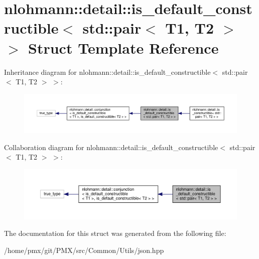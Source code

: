 \hypertarget{structnlohmann_1_1detail_1_1is__default__constructible_3_01std_1_1pair_3_01T1_00_01T2_01_4_01_4}{}\section{nlohmann\+:\+:detail\+:\+:is\+\_\+default\+\_\+constructible$<$ std\+:\+:pair$<$ T1, T2 $>$ $>$ Struct Template Reference}
\label{structnlohmann_1_1detail_1_1is__default__constructible_3_01std_1_1pair_3_01T1_00_01T2_01_4_01_4}


Inheritance diagram for nlohmann\+:\+:detail\+:\+:is\+\_\+default\+\_\+constructible$<$ std\+:\+:pair$<$ T1, T2 $>$ $>$\+:
\nopagebreak
\begin{figure}[H]
\begin{center}
\leavevmode
\includegraphics[width=350pt]{structnlohmann_1_1detail_1_1is__default__constructible_3_01std_1_1pair_3_01T1_00_01T2_01_4_01_4__inherit__graph}
\end{center}
\end{figure}


Collaboration diagram for nlohmann\+:\+:detail\+:\+:is\+\_\+default\+\_\+constructible$<$ std\+:\+:pair$<$ T1, T2 $>$ $>$\+:
\nopagebreak
\begin{figure}[H]
\begin{center}
\leavevmode
\includegraphics[width=350pt]{structnlohmann_1_1detail_1_1is__default__constructible_3_01std_1_1pair_3_01T1_00_01T2_01_4_01_4__coll__graph}
\end{center}
\end{figure}


The documentation for this struct was generated from the following file\+:\begin{DoxyCompactItemize}
\item 
/home/pmx/git/\+P\+M\+X/src/\+Common/\+Utils/json.\+hpp\end{DoxyCompactItemize}
